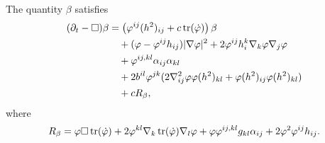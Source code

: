 \documentclass{amsart}
\begin{document}
\begin{lemma}
\label{lem:evbeta}
The quantity $\beta$
satisfies
\[
\begin{split}
(\partial_{t} - \Box)\beta &= \left(\varphi^{ij}(h^2)_{ij} + c\operatorname{tr}(\dot{\varphi}) \right)\beta \\
&\quad + (\varphi - \varphi^{ij}h_{ij}) |\nabla\varphi|^{2} + 2\varphi^{ij}h^{k}_{i}\nabla_k \varphi \nabla_j \varphi \\
&\quad + \varphi^{ij,kl} \alpha_{ij} \alpha_{kl} \\
&\quad + 2b^{il}\varphi^{jk} (2\nabla^2_{ij}\varphi\varphi(h^2)_{kl} + \varphi(h^2)_{ij}\varphi(h^2)_{kl}) \\
&\quad + cR_{\beta},
\end{split}
\]
where
\[
R_{\beta} = \varphi \Box \operatorname{tr}(\dot{\varphi}) + 2\varphi^{kl} \nabla_k \operatorname{tr}(\dot{\varphi}) \nabla_l \varphi + \varphi \varphi^{ij,kl}g_{kl} \alpha_{ij} + 2\varphi^{2}\varphi^{ij}h_{ij}.
\]
\end{lemma}
\end{document}
